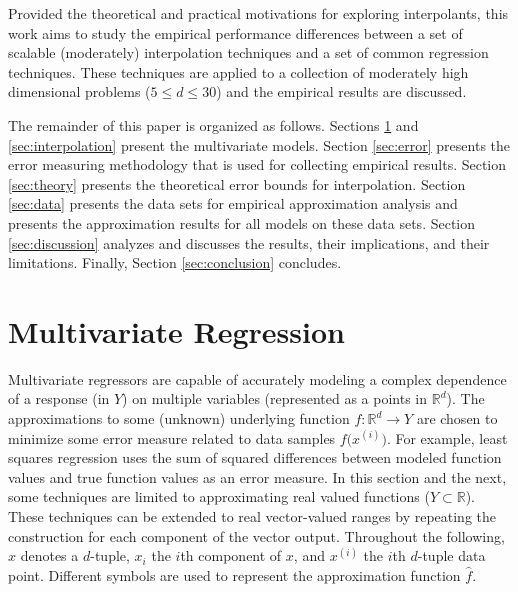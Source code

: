 \documentclass[smallextended,final]{svjour3}       %
\begin{document}
Provided the theoretical and practical motivations for exploring interpolants, this work aims to study the empirical performance differences between a set of scalable (moderately) interpolation techniques and a set of common regression techniques. These techniques are applied to a collection of moderately high dimensional problems ($5 \le d \le 30$) and the empirical results are discussed.

The remainder of this paper is organized as follows. Sections \ref{sec:regression} and \ref{sec:interpolation} present the multivariate models. Section \ref{sec:error} presents the error measuring methodology that is used for collecting empirical results. Section \ref{sec:theory} presents the theoretical error bounds for interpolation. Section \ref{sec:data} presents the data sets for empirical approximation analysis and presents the approximation results for all models on these data sets. Section \ref{sec:discussion} analyzes and discusses the results, their implications, and their limitations. Finally, Section \ref{sec:conclusion} concludes.



\section{Multivariate Regression}
\label{sec:regression}
Multivariate regressors are capable of accurately modeling a complex dependence of a response (in $Y$) on multiple variables (represented as a points in $\mathbb{R}^{d}$). The approximations to some (unknown) underlying function $f: \mathbb{R}^d \rightarrow Y$ are chosen to minimize some error measure related to data samples $f\bigl(x^{(i)}\bigr)$. For example, least squares regression uses the sum of squared differences between modeled function values and true function values as an error measure. In this section and the next, some techniques are limited to approximating real valued functions ($Y \subset \mathbb{R}$). These techniques can be extended to real vector-valued ranges by repeating the construction for each component of the vector output. Throughout the following, $x$ denotes a $d$-tuple, $x_i$ the $i$th component of $x$, and $x^{(i)}$ the $i$th $d$-tuple data point. Different symbols are used to represent the approximation function $\hat f$.
\end{document}
